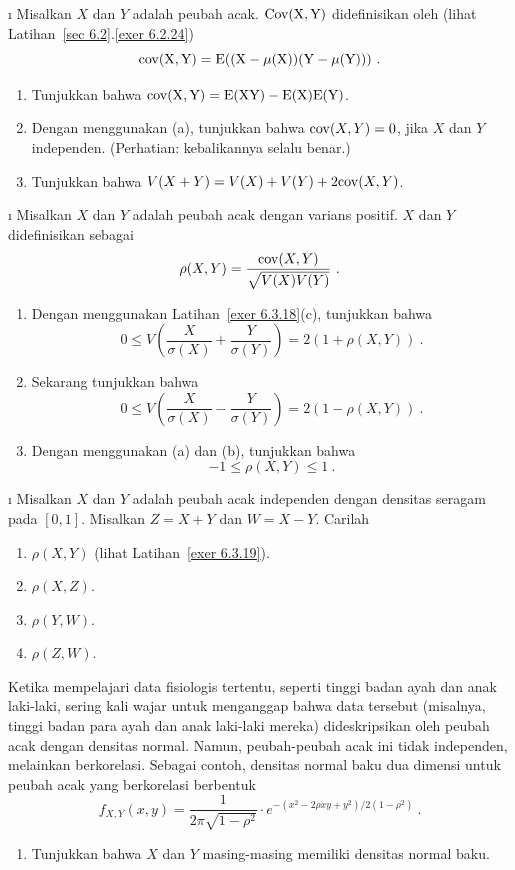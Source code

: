 {\begin{LJSItem}
\i\label{exer 6.3.18} Misalkan $X$ dan $Y$ adalah peubah acak. 
$\rm {Cov}(X,Y)$ didefinisikan oleh (lihat Latihan~\ref{sec 6.2}.\ref{exer 6.2.24})
$$
\rm {cov}(X,Y) = E ((X - \mu(X))(Y - \mu(Y)) )\ .
$$
\begin{enumerate}
\item Tunjukkan bahwa $\rm {cov}(X,Y) = E(XY) - E(X)E(Y)$.

\item Dengan menggunakan (a), tunjukkan bahwa ${\rm cov}(X,Y) = 0$, jika $X$ dan
$Y$ independen. (Perhatian: kebalikannya  selalu benar.)

\item Tunjukkan bahwa $V(X + Y) = V(X) + V(Y) + 2{\rm cov}(X,Y)$.
\end{enumerate}

\i\label{exer 6.3.19} Misalkan $X$ dan $Y$ adalah peubah acak dengan varians positif.
 $X$ dan $Y$ didefinisikan sebagai
$$
\rho(X,Y) = \frac{{\rm cov}(X,Y)}{\sqrt{V(X)V(Y)}}\ .
$$
\begin{enumerate}
\item Dengan menggunakan Latihan~\ref{exer 6.3.18}(c), tunjukkan bahwa
$$ 0 \leq V\left( \frac X{\sigma(X)} + \frac Y{\sigma(Y)} \right) = 2(1 +
\rho(X,Y))\ .
$$

\item Sekarang tunjukkan bahwa
$$ 0 \leq V\left( \frac X{\sigma(X)} - \frac Y{\sigma(Y)} \right) = 2(1 -
\rho(X,Y))\ .
$$

\item Dengan menggunakan (a) dan (b), tunjukkan bahwa
$$ -1 \leq \rho(X,Y) \leq 1\ .
$$
\end{enumerate}

\i\label{exer 6.3.20} Misalkan $X$ dan $Y$ adalah peubah acak independen dengan
densitas seragam pada $[0,1]$. Misalkan $Z = X + Y$ dan $W = X - Y$. Carilah

\begin{enumerate}
\item $\rho(X,Y)$ (lihat Latihan~\ref{exer 6.3.19}).

\item $\rho(X,Z)$.

\item $\rho(Y,W)$.

\item $\rho(Z,W)$.
\end{enumerate}

\istar\label{exer 6.3.21} Ketika mempelajari data fisiologis tertentu, seperti tinggi
badan ayah dan anak laki-laki, sering kali wajar untuk menganggap bahwa data tersebut
(misalnya, tinggi badan para ayah dan anak laki-laki mereka) dideskripsikan oleh peubah
acak dengan densitas normal. Namun, peubah-peubah acak ini tidak independen, melainkan
berkorelasi. Sebagai contoh, densitas normal baku dua dimensi untuk peubah acak yang
berkorelasi berbentuk
$$ f_{X,Y}(x,y) = \frac 1{2\pi\sqrt{1 - \rho^2}} \cdot e^{-(x^2 - 2\rho xy + y^2)/2(1
- \rho^2)}\ .
$$
\begin{enumerate}
\item Tunjukkan bahwa $X$ dan $Y$ masing-masing memiliki densitas normal baku.


\end{enumerate}
\end{LJSItem}}
